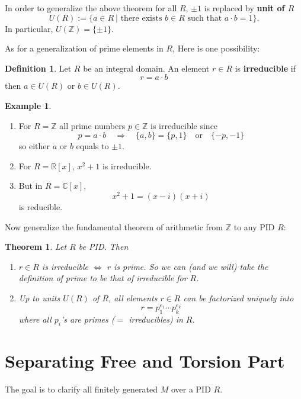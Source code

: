 \documentclass[11pt,openany]{book}
\theoremstyle{plain}
\newtheorem{theorem}{Theorem}[chapter]
\theoremstyle{definition}
\newtheorem{definition}[definition]{Definition}
\newtheorem{example}[example]{Example}
\theoremstyle{remark}
\begin{document}
In order to generalize the above theorem for all $R$, $\pm 1$ is replaced by {\bf unit of $R$}
$$U(R):=\{a\in R\ |\text{ there exists }b\in R\text{ such that }a\cdot b=1\}.$$
In particular, $U(\mathbb{Z}) = \{\pm 1\}$. 

As for a generalization of prime elements in $R$, Here is one possibility:

\begin{definition}
    Let $R$ be an integral domain. An element $r\in R$ is {\bf irreducible} if
    $$r=a\cdot b$$
    then $a\in U(R)$ or $b\in U(R)$.
\end{definition}

\begin{example}\
    \begin{enumerate}
        \item For $R=\mathbb{Z}$ all prime numbers $p\in\mathbb{Z}$ is irreducible since
        $$p=a\cdot b\quad\Rightarrow\quad\{a,b\}=
            \{p,1\} \quad \text{or}\quad
            \{-p,-1\}$$
        so either $a$ or $b$ equals to $\pm1$.
        \item For $R=\mathbb{R}[x]$, $x^2+1$ is irreducible.\\
        \item But in $R=\mathbb{C}[x]$, 
        $$x^2+1=(x-i)(x+i)$$ is reducible.
    \end{enumerate}
\end{example}

Now generalize the fundamental theorem of arithmetic from $\mathbb{Z}$ to any PID $R$:

\begin{theorem}
    Let $R$ be PID. Then
    \begin{enumerate}
        \item $r\in R$ is irreducible $\Leftrightarrow$ $r$ is prime. So we can (and we will) take the definition of prime to be that of irreducible for $R$.
        \item Up to units $U(R)$ of $R$, all elements $r\in R$ can be factorized uniquely into 
        $$r=p_1^{e_1}\cdots p_k^{e_k}$$
        where all $p_i$'s are primes ($=$ irreducibles) in $R$.
    \end{enumerate}
\end{theorem}

\section{Separating Free and Torsion Part}
The goal is to clarify all finitely generated $M$ over a PID $R$.
\end{document}
